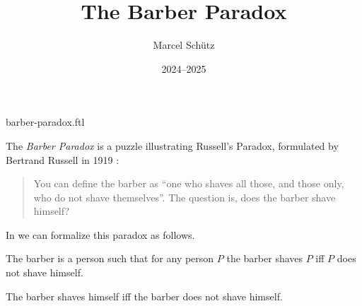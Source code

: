 \documentclass{article}
\title{The Barber Paradox}
\author{Marcel Schütz}
\date{2024--2025}
\begin{document}
\begin{smodule}{barber-paradox.ftl}
\maketitle


\noindent The \emph{Barber Paradox} is a puzzle illustrating Russell's
Paradox, formulated by Bertrand Russell in 1919 \cite[p. 355]{Russell1919}:

\begin{quotation}
  \ifstexhtml\else\noindent\fi
  You can define the barber as ``one who shaves all those, and 
  those only, who do not shave themselves''.
  The question is, does the barber shave himself?
\end{quotation}

\noindent In \Naproche we can formalize this paradox as follows.

\begin{forthel}
  \begin{signature*}
    The barber is a person such that for any person $P$ the barber shaves $P$ iff $P$ does not shave himself.
  \end{signature*}
  
  \begin{theorem*}[title=Barber Paradox,id=barber_paradox]
    The barber shaves himself iff the barber does not shave himself.
  \end{theorem*}
\end{forthel}

\printbibliography
{}
\end{smodule}
\end{document}
